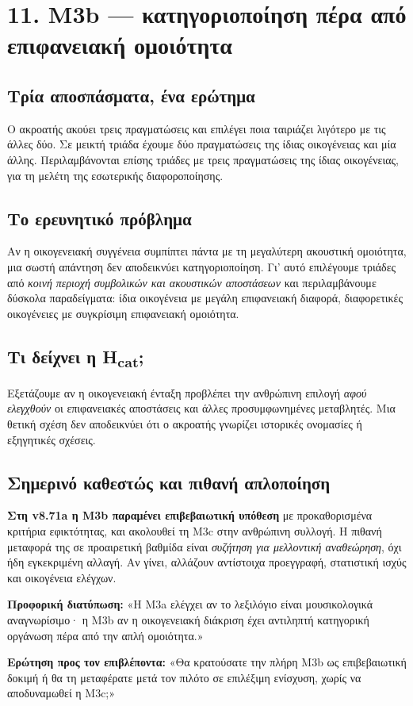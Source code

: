 \documentclass[9pt,a4paper]{extarticle}
\newcommand{\say}[1]{\begin{keybox}\textbf{Προφορική διατύπωση:} #1\end{keybox}}
\newcommand{\ask}[1]{\begin{warnbox}\textbf{Ερώτηση προς τον επιβλέποντα:} #1\end{warnbox}}
\begin{document}
\section*{11. M3b — κατηγοριοποίηση πέρα από επιφανειακή ομοιότητα}
\subsection*{Τρία αποσπάσματα, ένα ερώτημα}
Ο ακροατής ακούει τρεις πραγματώσεις και επιλέγει ποια ταιριάζει λιγότερο με τις άλλες δύο. Σε μεικτή τριάδα έχουμε δύο πραγματώσεις της ίδιας οικογένειας και μία άλλης. Περιλαμβάνονται επίσης τριάδες με τρεις πραγματώσεις της ίδιας οικογένειας, για τη μελέτη της εσωτερικής διαφοροποίησης.
\subsection*{Το ερευνητικό πρόβλημα}
Αν η οικογενειακή συγγένεια συμπίπτει πάντα με τη μεγαλύτερη ακουστική ομοιότητα, μια σωστή απάντηση δεν αποδεικνύει κατηγοριοποίηση. Γι' αυτό επιλέγουμε τριάδες από \emph{κοινή περιοχή συμβολικών και ακουστικών αποστάσεων} και περιλαμβάνουμε δύσκολα παραδείγματα: ίδια οικογένεια με μεγάλη επιφανειακή διαφορά, διαφορετικές οικογένειες με συγκρίσιμη επιφανειακή ομοιότητα.
\subsection*{Τι δείχνει η H\textsubscript{cat};}
Εξετάζουμε αν η οικογενειακή ένταξη προβλέπει την ανθρώπινη επιλογή \emph{αφού ελεγχθούν} οι επιφανειακές αποστάσεις και άλλες προσυμφωνημένες μεταβλητές. Μια θετική σχέση δεν αποδεικνύει ότι ο ακροατής γνωρίζει ιστορικές ονομασίες ή εξηγητικές σχέσεις.
\subsection*{Σημερινό καθεστώς και πιθανή απλοποίηση}
\textbf{Στη v8.71a η M3b παραμένει επιβεβαιωτική υπόθεση} με προκαθορισμένα κριτήρια εφικτότητας, και ακολουθεί τη M3c στην ανθρώπινη συλλογή. Η πιθανή μεταφορά της σε προαιρετική βαθμίδα είναι \emph{συζήτηση για μελλοντική αναθεώρηση}, όχι ήδη εγκεκριμένη αλλαγή. Αν γίνει, αλλάζουν αντίστοιχα προεγγραφή, στατιστική ισχύς και οικογένεια ελέγχων.
\say{«Η M3a ελέγχει αν το λεξιλόγιο είναι μουσικολογικά αναγνωρίσιμο· η M3b αν η οικογενειακή διάκριση έχει αντιληπτή κατηγορική οργάνωση πέρα από την απλή ομοιότητα.»}
\ask{«Θα κρατούσατε την πλήρη M3b ως επιβεβαιωτική δοκιμή ή θα τη μεταφέρατε μετά τον πιλότο σε επιλέξιμη ενίσχυση, χωρίς να αποδυναμωθεί η M3c;»}
\newpage
\end{document}

